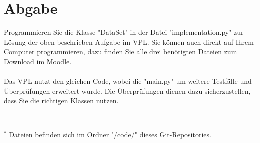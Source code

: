\documentclass{article}
\begin{document}
	\section{Abgabe}
		Programmieren Sie die Klasse "DataSet" in der Datei "implementation.py" zur Lösung der oben beschrieben Aufgabe im VPL.
		Sie können auch direkt auf Ihrem Computer programmieren, dazu finden Sie alle drei benötigten Dateien zum Download im Moodle.\\
		\\
		Das VPL nutzt den gleichen Code, wobei die "main.py" um weitere Testfälle und Überprüfungen erweitert wurde.
		Die Überprüfungen dienen dazu sicherzustellen, dass Sie die richtigen Klassen nutzen.\\
	
		\hrule\hfill\\[0.2cm]
		$^*$ Dateien befinden sich im Ordner "/code/" dieses Git-Repositories.\\
\end{document}
